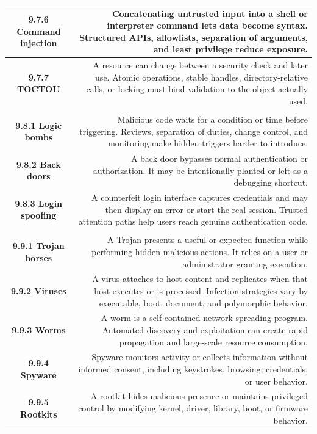 \documentclass[10pt,letterpaper]{article}
\begin{document}
\begin{longtable}{C N}
\textbf{9.7.6 Command injection} & Concatenating untrusted input into a shell or interpreter command lets data become syntax. Structured APIs, allowlists, separation of arguments, and least privilege reduce exposure.\\\hline
\textbf{9.7.7 TOCTOU} & A resource can change between a security check and later use. Atomic operations, stable handles, directory-relative calls, or locking must bind validation to the object actually used.\\\hline
{}\\*\hline
\textbf{9.8.1 Logic bombs} & Malicious code waits for a condition or time before triggering. Reviews, separation of duties, change control, and monitoring make hidden triggers harder to introduce.\\\hline
\textbf{9.8.2 Back doors} & A back door bypasses normal authentication or authorization. It may be intentionally planted or left as a debugging shortcut.\\\hline
\textbf{9.8.3 Login spoofing} & A counterfeit login interface captures credentials and may then display an error or start the real session. Trusted attention paths help users reach genuine authentication code.\\\hline
{}\\*\hline
\textbf{9.9.1 Trojan horses} & A Trojan presents a useful or expected function while performing hidden malicious actions. It relies on a user or administrator granting execution.\\\hline
\textbf{9.9.2 Viruses} & A virus attaches to host content and replicates when that host executes or is processed. Infection strategies vary by executable, boot, document, and polymorphic behavior.\\\hline
\textbf{9.9.3 Worms} & A worm is a self-contained network-spreading program. Automated discovery and exploitation can create rapid propagation and large-scale resource consumption.\\\hline
\textbf{9.9.4 Spyware} & Spyware monitors activity or collects information without informed consent, including keystrokes, browsing, credentials, or user behavior.\\\hline
\textbf{9.9.5 Rootkits} & A rootkit hides malicious presence or maintains privileged control by modifying kernel, driver, library, boot, or firmware behavior.\\\hline

\end{longtable}
\end{document}
